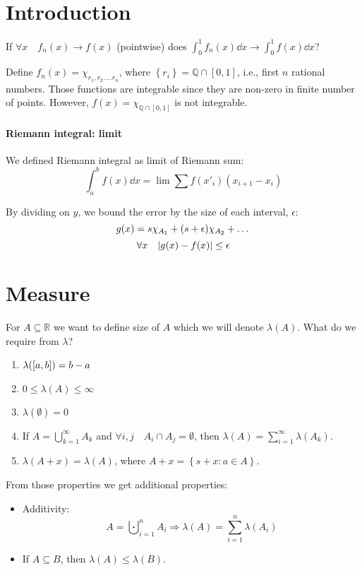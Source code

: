 \section{Introduction}
If $\forall x \quad f_n(x) \to f(x)$ (pointwise) does $\int_0^1 f_n(x) \dd{x} \to \int_0^1 f(x) \dd{x}$?

Define $f_n(x) = \chi_{r_1, r_2, \dots r_n}$, where $\left\{ r_i \right\} = \mathbb{Q} \cap [0,1]$, i.e., first $n$ rational numbers. Those functions are integrable since they are non-zero in finite number of points. However, $f(x) = \chi_{\mathbb{Q} \cap [0,1]}$ is not integrable.
\paragraph{Riemann integral: limit}
We defined Riemann integral as limit of Riemann sum:
$$\int_a^b f(x) \dd{x} = \lim \sum f(x'_i)(x_{i+1}-x_i)$$

\begin{center}
	
\end{center}

By dividing on $y$, we bound the error by the size of each interval, $\epsilon$:
$$g(x) = s\chi_{A_1} + \qty(s+\epsilon)\chi_{A_2} + \dots$$
$$\forall x \quad \abs{g(x)-f(x)} \leq \epsilon
$$
\section{Measure}
For $A\subseteq \mathbb{R}$ we want to define size of $A$ which we will denote $\lambda(A)$. What do we require from $\lambda$?
\begin{enumerate}
	\item $\lambda(\qty[a,b]) = b- a$
	\item $0\leq \lambda(A) \leq \infty$
	\item $\lambda(\emptyset) = 0$
	\item If $A = \bigcup_{k=1}^\infty A_k$ and $\forall i,j \quad A_i \cap A_j = \emptyset$, then $\lambda(A) = \sum_{i=1}^\infty \lambda(A_k)$.
	\item $\lambda(A+x) = \lambda(A)$, where $A+x = \left\{s+x: a\in A \right\}$.
\end{enumerate}

From those properties we get additional properties:
\begin{itemize}
	\item Additivity:
	$$A = \bigcupdot_{i=1}^n A_i  \Rightarrow \lambda(A) = \sum_{i=1}^n \lambda(A_i)$$
	\item  If $A \subseteq B$, then $\lambda(A) \leq \lambda(B)$.
\end{itemize}

